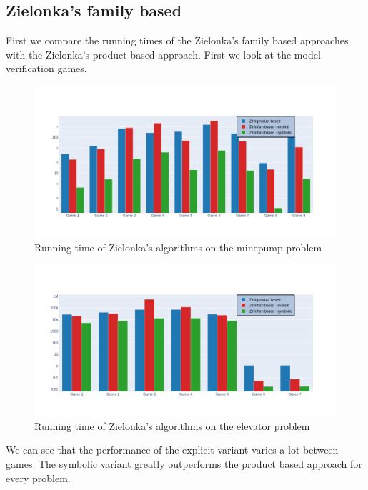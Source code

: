 \subsection{Zielonka's family based}
First we compare the running times of the Zielonka's family based approaches with the Zielonka's product based approach. First we look at the model verification games.
\begin{figure}[H]
	\includegraphics[width=1\linewidth]{"results/minepump/Zlnk product based_Zlnk fam based - explicit_Zlnk fam based - symbolic_"}
	\caption{Running time of Zielonka's algorithms on the minepump problem}
	\label{fig:minepumpzlnks}
\end{figure}%
\begin{figure}[H]
	\includegraphics[width=1\linewidth]{"results/elevator/Zlnk product based_Zlnk fam based - explicit_Zlnk fam based - symbolic_"}
	\caption{Running time of Zielonka's algorithms on the elevator problem}
	\label{fig:elevatorzlnks}
\end{figure}%
We can see that the performance of the explicit variant varies a lot between games. The symbolic variant greatly outperforms the product based approach for every problem.

